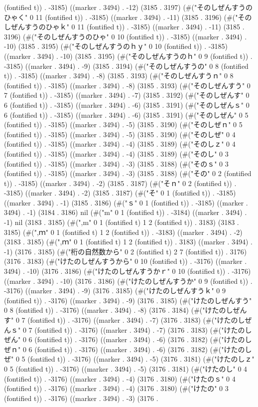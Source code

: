 (fontified t)) . -3185) ((marker . 3494) . -12) (3185 . 3197) (#("そのしぜんすうのひゃく" 0 11 (fontified t)) . -3185) ((marker . 3494) . -11) (3185 . 3196) (#("そのしぜんすうのひゃｋ" 0 11 (fontified t)) . -3185) ((marker . 3494) . -11) (3185 . 3196) (#("そのしぜんすうのひゃ" 0 10 (fontified t)) . -3185) ((marker . 3494) . -10) (3185 . 3195) (#("そのしぜんすうのｈｙ" 0 10 (fontified t)) . -3185) ((marker . 3494) . -10) (3185 . 3195) (#("そのしぜんすうのｈ" 0 9 (fontified t)) . -3185) ((marker . 3494) . -9) (3185 . 3194) (#("そのしぜんすうの" 0 8 (fontified t)) . -3185) ((marker . 3494) . -8) (3185 . 3193) (#("そのしぜんすうｎ" 0 8 (fontified t)) . -3185) ((marker . 3494) . -8) (3185 . 3193) (#("そのしぜんすう" 0 7 (fontified t)) . -3185) ((marker . 3494) . -7) (3185 . 3192) (#("そのしぜんす" 0 6 (fontified t)) . -3185) ((marker . 3494) . -6) (3185 . 3191) (#("そのしぜんｓ" 0 6 (fontified t)) . -3185) ((marker . 3494) . -6) (3185 . 3191) (#("そのしぜん" 0 5 (fontified t)) . -3185) ((marker . 3494) . -5) (3185 . 3190) (#("そのしぜｎ" 0 5 (fontified t)) . -3185) ((marker . 3494) . -5) (3185 . 3190) (#("そのしぜ" 0 4 (fontified t)) . -3185) ((marker . 3494) . -4) (3185 . 3189) (#("そのしｚ" 0 4 (fontified t)) . -3185) ((marker . 3494) . -4) (3185 . 3189) (#("そのし" 0 3 (fontified t)) . -3185) ((marker . 3494) . -3) (3185 . 3188) (#("そのｓ" 0 3 (fontified t)) . -3185) ((marker . 3494) . -3) (3185 . 3188) (#("その" 0 2 (fontified t)) . -3185) ((marker . 3494) . -2) (3185 . 3187) (#("そｎ" 0 2 (fontified t)) . -3185) ((marker . 3494) . -2) (3185 . 3187) (#("そ" 0 1 (fontified t)) . -3185) ((marker . 3494) . -1) (3185 . 3186) (#("ｓ" 0 1 (fontified t)) . -3185) ((marker . 3494) . -1) (3184 . 3186) nil (#("m" 0 1 (fontified t)) . -3184) ((marker . 3494) . -1) nil (3183 . 3185) (#(",m" 0 1 (fontified t) 1 2 (fontified t)) . 3183) (3183 . 3185) (#(",ｍ" 0 1 (fontified t) 1 2 (fontified t)) . -3183) ((marker . 3494) . -2) (3183 . 3185) (#(",ｍ" 0 1 (fontified t) 1 2 (fontified t)) . 3183) ((marker . 3494) . -1) (3176 . 3185) (#("桁の自然数から" 0 2 (fontified t) 2 7 (fontified t)) . 3176) (3176 . 3183) (#("けたのしぜんすうから" 0 10 (fontified t)) . -3176) ((marker . 3494) . -10) (3176 . 3186) (#("けたのしぜんすうかｒ" 0 10 (fontified t)) . -3176) ((marker . 3494) . -10) (3176 . 3186) (#("けたのしぜんすうか" 0 9 (fontified t)) . -3176) ((marker . 3494) . -9) (3176 . 3185) (#("けたのしぜんすうｋ" 0 9 (fontified t)) . -3176) ((marker . 3494) . -9) (3176 . 3185) (#("けたのしぜんすう" 0 8 (fontified t)) . -3176) ((marker . 3494) . -8) (3176 . 3184) (#("けたのしぜんす" 0 7 (fontified t)) . -3176) ((marker . 3494) . -7) (3176 . 3183) (#("けたのしぜんｓ" 0 7 (fontified t)) . -3176) ((marker . 3494) . -7) (3176 . 3183) (#("けたのしぜん" 0 6 (fontified t)) . -3176) ((marker . 3494) . -6) (3176 . 3182) (#("けたのしぜｎ" 0 6 (fontified t)) . -3176) ((marker . 3494) . -6) (3176 . 3182) (#("けたのしぜ" 0 5 (fontified t)) . -3176) ((marker . 3494) . -5) (3176 . 3181) (#("けたのしｚ" 0 5 (fontified t)) . -3176) ((marker . 3494) . -5) (3176 . 3181) (#("けたのし" 0 4 (fontified t)) . -3176) ((marker . 3494) . -4) (3176 . 3180) (#("けたのｓ" 0 4 (fontified t)) . -3176) ((marker . 3494) . -4) (3176 . 3180) (#("けたの" 0 3 (fontified t)) . -3176) ((marker . 3494) . -3) (3176 . 